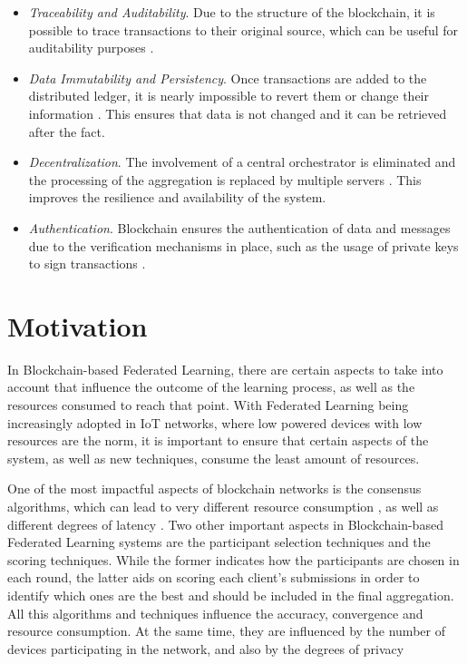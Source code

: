 \begin{itemize}
    \item \textit{Traceability and Auditability}. Due to the structure of the blockchain, it is possible to trace transactions to their original source, which can be useful for auditability purposes \cite{10.48550/arxiv.1902.01046, 10.48550/arxiv.2110.02182}.
    
    \item \textit{Data Immutability and Persistency}. Once transactions are added to the distributed ledger, it is nearly impossible to revert them or change their information \cite{10.48550/arxiv.1902.01046, qu_blockchain-enabled_2022}. This ensures that data is not changed and it can be retrieved after the fact.
    
    \item \textit{Decentralization}. The involvement of a central orchestrator is eliminated and the processing of the aggregation is replaced by multiple servers \cite{10.48550/arxiv.2009.09338, 9403374, 10.48550/arxiv.2110.02182, qu_blockchain-enabled_2022}. This improves the resilience and availability of the system.
    
    \item \textit{Authentication}. Blockchain ensures the authentication of data and messages due to the verification mechanisms in place, such as the usage of private keys to sign transactions \cite{qu_blockchain-enabled_2022}.
\end{itemize}

\section{Motivation}\label{intro:motivation}

In Blockchain-based Federated Learning, there are certain aspects to take into account that influence the outcome of the learning process, as well as the resources consumed to reach that point. With Federated Learning being increasingly adopted in IoT networks, where low powered devices with low resources are the norm, it is important to ensure that certain aspects of the system, as well as new techniques, consume the least amount of resources.

One of the most impactful aspects of blockchain networks is the consensus algorithms, which can lead to very different resource consumption \cite{ccaf}, as well as different degrees of latency \cite{Alqahtani_2021}. Two other important aspects in Blockchain-based Federated Learning systems are the participant selection techniques and the scoring techniques. While the former indicates how the participants are chosen in each round, the latter aids on scoring each client's submissions in order to identify which ones are the best and should be included in the final aggregation. All this algorithms and techniques influence the accuracy, convergence and resource consumption. At the same time, they are influenced by the number of devices participating in the network, and also by the degrees of privacy

